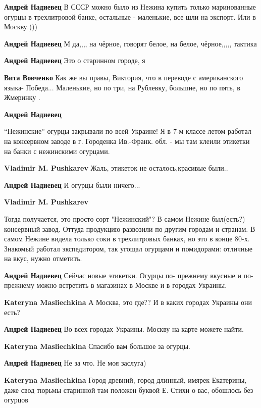 \begin{itemize}
\begin{itemize}
\begin{itemize} %
\textbf{Андрей Надиевец} В СССР можно было из Нежина купить только маринованные огурцы в трехлитровой банке, остальные - маленькие, все шли на экспорт. Или в Москву.)))

\textbf{Андрей Надиевец} М да,,,, на чёрное, говорят белое, на белое, чёрное,,,,, тактика

\textbf{Андрей Надиевец} Это о старинном городе, я

\textbf{Вита Вовченко} Как же вы правы, Виктория, что в переводе с американского языка- Победа... Маленькие, но по три, на Рублевку, большие, но по пять, в Жмеринку .

\textbf{Андрей Надиевец} 

\enquote{Нежинские} огурцы закрывали по всей Украине! Я в 7-м классе летом
работал на консервном заводе в г. Городенка Ив.-Франк. обл. - мы там клеили
этикетки на банки с нежинскими огурцами.


\textbf{Vladimir M. Pushkarev} Жаль, этикеток не осталось,красивые были..

\textbf{Андрей Надиевец} И огурцы были ничего...

\textbf{Vladimir M. Pushkarev} 

Тогда получается, это просто сорт "Нежинский"? В самом Нежине был(есть?)
консервный завод. Оттуда продукцию развозили по другим городам и странам. В
самом Нежине видела только соки в трехлитровых банках, но это в конце 80-х.
Знакомый работал экспедитором, так угощал огурцами и помидорами: отличные на
вкус, нужно отметить.


\textbf{Андрей Надиевец} Сейчас новые этикетки. Огурцы по- прежнему вкусные и по-прежнему можно встретить в магазинах в
Москве и в городах Украины.

\textbf{Kateryna Masliechkina} А Москва, это где?? И в каких городах Украины они есть?

\textbf{Андрей Надиевец} Во всех городах Украины. Москву на карте можете найти.

\textbf{Kateryna Masliechkina} Спасибо вам большое за огурцы.

\textbf{Андрей Надиевец} Не за что. Не моя заслуга)

\textbf{Kateryna Masliechkina} Город древний, город длинный, имярек Екатерины, даже свод тюрьмы старинной там положен буквой Е. Стихи о вас, обошлось без огурцов


\end{itemize}
\end{itemize}
\end{itemize}
